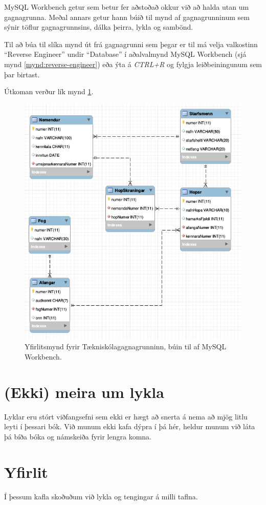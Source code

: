 MySQL Workbench getur sem betur fer aðstoðað okkur við að halda utan um gagnagrunna. Meðal annars getur hann búið til mynd af gagnagrunninum sem sýnir töflur gagnagrunnsins, dálka þeirra, lykla og sambönd.

Til að búa til slíka mynd út frá gagnagrunni sem þegar er til má velja valkostinn ``Reverse Engineer'' undir ``Database'' í aðalvalmynd MySQL Workbench (sjá mynd \ref{mynd:reverse-engineer}) eða ýta á \emph{CTRL+R} og fylgja leiðbeiningunum sem þar birtast. 

Útkoman verður lík mynd \ref{mynd:eer}.
\begin{figure}
\caption[Tækniskólagagnagrunnurinn]{Yfirlitsmynd fyrir Tækniskólagagnagrunninn, búin til af MySQL Workbench.}
\label{mynd:eer}
\centering
\includegraphics[width=\linewidth]{myndir/workbench-eer}
\end{figure}
\section{(Ekki) meira um lykla}
Lyklar eru stórt viðfangsefni sem ekki er hægt að snerta á nema að mjög litlu leyti í þessari bók. Við munum ekki kafa dýpra í þá hér, heldur munum við láta þá bíða bóka og námskeiða fyrir lengra komna.
\section{Yfirlit}
Í þessum kafla skoðuðum við lykla og tengingar á milli taflna.

